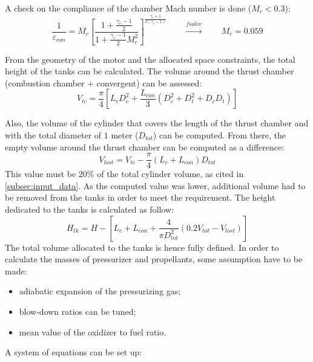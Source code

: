 A check on the compliance of the chamber Mach number is done ($M_c < 0.3$):
\begin{equation}    
    \frac{1}{\varepsilon_{con}} = M_c \left[ \frac{1 + \frac{\gamma_c - 1}{2}}{1 + \frac{\gamma_c - 1}{2} M_c^2} \right]^{\frac{\gamma_c + 1}{2(\gamma_c - 1)}}
    \qquad \xrightarrow{\textit{fsolve}} \qquad M_c = 0.059
\end{equation}

From the geometry of the motor and the allocated space constraints, the total height of the tanks can be calculated. The volume around the thrust chamber (combustion chamber + convergent) can be assessed:
\begin{equation}
    V_{tc} = \frac{\pi}{4} \left[L_c D_c^2  + \frac{L_{con}}{3} \left(D_c^2 + D_t^2 + D_c D_t\right)\right]
    \label{eq:v_tc}
\end{equation}

Also, the volume of the cylinder that covers the length of the thrust chamber and with the total diameter of $1$ meter ($D_{tot}$) can be computed. From there, the empty volume around the thrust chamber can be computed as a difference:
\begin{equation}
    V_{lost} =  V_{tc} - \frac{\pi}{4} \left(L_{c} + L_{con}\right) D_{tot}
\end{equation}
This value must be $20$\% of the total cylinder volume, as cited in \autoref{subsec:input_data}. As the computed value was lower, additional volume had to be removed from the tanks in order to meet the requirement. The height dedicated to the tanks is calculated as follow:
\begin{equation}
    H_{tk} =  H - \left[L_{c} + L_{con} + \frac{4}{\pi D_{tot}^2}\left( 0.2 V_{tot} - V_{lost}\right) \right]
\end{equation}
The total volume allocated to the tanks is hence fully defined. 
In order to calculate the masses of pressurizer and propellants, some assumption have to be made:
\begin{itemize}
    \item adiabatic expansion of the pressurizing gas;
    \item blow-down ratios can be tuned;
    \item mean value of the oxidizer to fuel ratio.
\end{itemize}

A system of equations can be set up:

